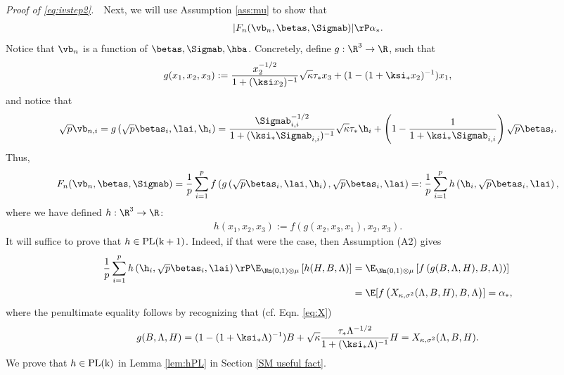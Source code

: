 \vspace{2pt}
\noindent\emph{Proof of \eqref{eq:ivstep2}.}~~Next, we will use Assumption \ref{ass:mu} to show that 
\begin{align}
|F_n(\vb_n,\betas,\Sigmab)| \rP \alpha_*.\label{eq:AO_conv}
\end{align}
Notice that $\vb_n$ is a function of $\betas,\Sigmab,\hba$. Concretely, define $g:\R^3\rightarrow\R$, such that
$$
g(x_1,x_2,x_3) := \frac{x_2^{-1/2}}{1+(\ksi x_2)^{-1}}\sqrt{\kappa}\tau_* x_3 + (1-(1+\ksi_*x_2)^{-1})x_1,
$$
and notice that
$$
\sqrt{p}\vb_{n,i} = g\left(\sqrt{p}\betas_i,\lai,\h_i\right) = \frac{{\Sigmab_{i,i}^{-1/2}}}{1+(\ksi_*\Sigmab_{i,i})^{-1}}\sqrt{\kappa}\tau_*\h_i +\left(1-\frac{1}{1+\ksi_*\Sigmab_{i,i}}\right)\sqrt{p}\betas_i.
$$
Thus,
$$
F_n(\vb_n,\betas,\Sigmab) = \frac{1}{p}\sum_{i=1}^p f\left(g\left(\sqrt{p}\betas_i,\lai,\h_i\right),\sqrt{p}\betas_i,\lai\right) =: \frac{1}{p}\sum_{i=1}^p h\left(\h_i,\sqrt{p}\betas_i,\lai\right),
$$
where we have defined $h:\R^3\rightarrow\R$:
\begin{align}
h(x_1,x_2,x_3) := f\left(g(x_2,x_3,x_1),x_2,x_3\right).\label{h func}
\end{align}
It will suffice to prove that $h\in\rm{PL}(k+1)$. Indeed, if that were the case, then Assumption (A2) gives
\begin{align}
\frac{1}{p}\sum_{i=1}^p h\left(\h_i,\sqrt{p}\betas_i,\lai\right) \rP \E_{\Nn(0,1)\otimes \mu}\left[h(H,B,\Lambda)\right] &=  \E_{\Nn(0,1)\otimes \mu}\left[f\left(g(B,\Lambda,H),B,\Lambda\right))\right]\\
& = \E[f\left(X_{\kappa,\sigma^2}(\Lambda,B,H),B,\Lambda\right)] = \alpha_*,
\end{align}
where the penultimate equality follows by recognizing that (cf. Eqn. \eqref{eq:X})
$$
g(B,\Lambda,H) = (1-(1+\ksi_*\Lambda)^{-1})B + \sqrt{\kappa}\frac{\tau_*\Lambda^{-1/2}}{1+(\ksi_*\Lambda)^{-1}}H =  X_{\kappa,\sigma^2}(\Lambda,B,H).
$$
We prove that $h\in\rm{PL}(k)$ in Lemma \ref{lem:hPL} in Section \ref{SM useful fact}.

